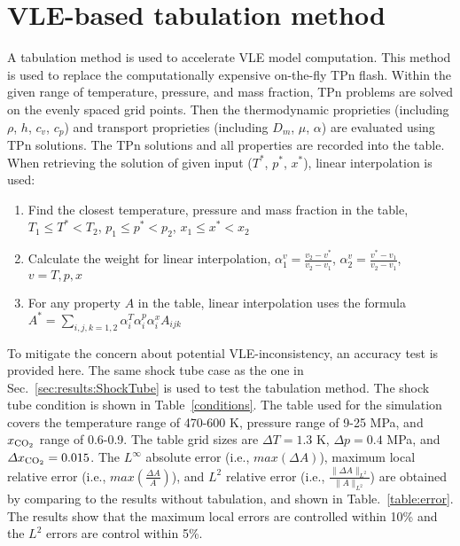     \section{VLE-based tabulation method} \label{App:tab} %
    
    A tabulation method is used to accelerate VLE model computation. This method is used to replace the computationally expensive on-the-fly TPn flash. Within the given range of temperature, pressure, and mass fraction, TPn problems are solved on the evenly spaced grid points. Then the thermodynamic proprieties (including $\rho$, $h$, $c_v$, $c_p$) and  transport  proprieties (including $D_m$, $\mu$, $\alpha$) are evaluated using TPn solutions. 
    The TPn solutions and all properties are recorded into the table. When retrieving the solution of given input ($T^*$, $p^*$, $x^*$), linear interpolation is used:
    \begin{enumerate}
     \item Find the closest temperature, pressure and mass fraction in the table, 
     $T_1 \leq T^* < T_2 $,
     $p_1 \leq p^* < p_2 $,
     $x_1 \leq x^* < x_2 $
     \item Calculate the weight for linear interpolation,
     $ \alpha^v_1=\frac{v_2-v^*}{v_2-v_1}$,
     $ \alpha^v_2=\frac{v^*-v_1}{v_2-v_1}$, $v=T,p,x$
     \item For any property $A$ in the table, linear interpolation uses the formula $A^* = \sum_{i,j,k=1,2}\alpha^T_i \alpha^p_i \alpha^x_i A_{ijk} $
    \end{enumerate}
    
    To mitigate the concern about potential VLE-inconsistency, an accuracy test is provided here. The same shock tube case as the one in Sec.~\ref{sec:results:ShockTube} is used to test the tabulation method. The shock tube condition is shown in Table~\ref{conditions}.
    The table used for the simulation covers the temperature range of 470-600 K, pressure range of 9-25 MPa, and $x_{\ce{CO2}}$ range of 0.6-0.9. The table grid sizes are $\Delta T = 1.3$ K, $\Delta p = 0.4$ MPa, and $\Delta x_{\ce{CO2}} = 0.015$.
    The $L^{\infty}$ absolute error (i.e., $max(\Delta A)$), maximum local relative error (i.e., $max(\frac{\Delta A}{A})$), and $L^2$ relative error (i.e., $ \frac{\|\Delta A\|_{L^2}}{\|A\|_{L^2}}$) are obtained by comparing to the results without tabulation, and shown in Table.~\ref{table:error}. The results show that the maximum local errors are controlled within 10\% and the $L^2$ errors are control within 5\%.

